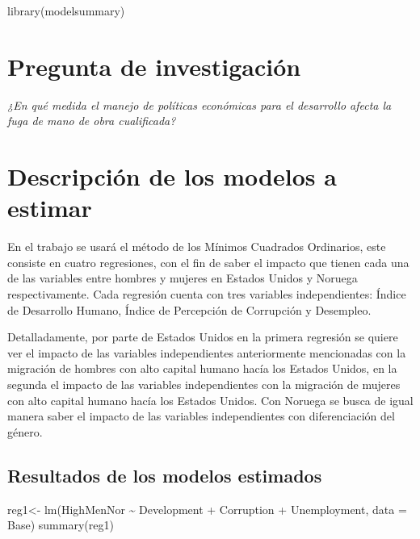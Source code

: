 \documentclass[
]{article}
\newenvironment{Shaded}{\begin{snugshade}}{\end{snugshade}}
\newcommand{\AttributeTok}[1]{\textcolor[rgb]{0.77,0.63,0.00}{#1}}
\newcommand{\FunctionTok}[1]{\textcolor[rgb]{0.00,0.00,0.00}{#1}}
\newcommand{\NormalTok}[1]{#1}
\newcommand{\OtherTok}[1]{\textcolor[rgb]{0.56,0.35,0.01}{#1}}
\newcommand{\SpecialCharTok}[1]{\textcolor[rgb]{0.00,0.00,0.00}{#1}}
\begin{document}
\begin{Shaded}
\begin{Highlighting}[]
\FunctionTok{library}\NormalTok{(modelsummary)}
\end{Highlighting}
\end{Shaded}

\hypertarget{pregunta-de-investigaciuxf3n}{%
\section{Pregunta de investigación}\label{pregunta-de-investigaciuxf3n}}

\emph{¿En qué medida el manejo de políticas económicas para el
desarrollo afecta la fuga de mano de obra cualificada?}

\hypertarget{descripciuxf3n-de-los-modelos-a-estimar}{%
\section{Descripción de los modelos a
estimar}\label{descripciuxf3n-de-los-modelos-a-estimar}}

En el trabajo se usará el método de los Mínimos Cuadrados Ordinarios,
este consiste en cuatro regresiones, con el fin de saber el impacto que
tienen cada una de las variables entre hombres y mujeres en Estados
Unidos y Noruega respectivamente. Cada regresión cuenta con tres
variables independientes: Índice de Desarrollo Humano, Índice de
Percepción de Corrupción y Desempleo.

Detalladamente, por parte de Estados Unidos en la primera regresión se
quiere ver el impacto de las variables independientes anteriormente
mencionadas con la migración de hombres con alto capital humano hacía
los Estados Unidos, en la segunda el impacto de las variables
independientes con la migración de mujeres con alto capital humano hacía
los Estados Unidos. Con Noruega se busca de igual manera saber el
impacto de las variables independientes con diferenciación del género.

\hypertarget{resultados-de-los-modelos-estimados}{%
\subsection{Resultados de los modelos
estimados}\label{resultados-de-los-modelos-estimados}}

\begin{Shaded}
\begin{Highlighting}[]
\NormalTok{reg1}\OtherTok{\textless{}{-}} \FunctionTok{lm}\NormalTok{(HighMenNor }\SpecialCharTok{\textasciitilde{}}\NormalTok{ Development }\SpecialCharTok{+}\NormalTok{ Corruption }\SpecialCharTok{+}\NormalTok{ Unemployment, }\AttributeTok{data =}\NormalTok{ Base)}
\FunctionTok{summary}\NormalTok{(reg1)}
\end{Highlighting}
\end{Shaded}
\end{document}
